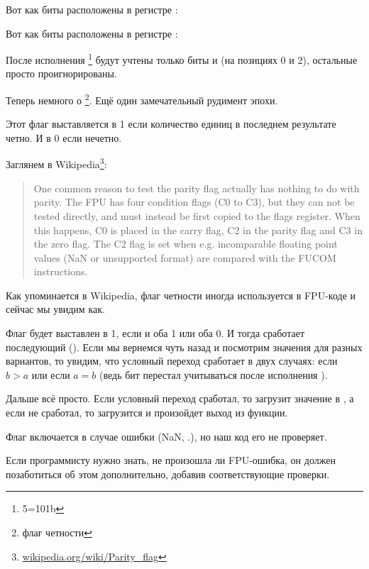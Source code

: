 Вот как биты \CThreeBits расположены в регистре \AX:



Вот как биты \CThreeBits расположены в регистре \AH:



После исполнения \footnote{5=101b} %
будут учтены только биты \Czero и \Ctwo (на позициях 0 и 2), остальные просто проигнорированы.

\label{parity_flag}
Теперь немного о \footnote{флаг четности}. 
Ещё один замечательный рудимент эпохи.

Этот флаг выставляется в 1 если количество единиц в последнем результате четно. 
И в 0 если нечетно.

Заглянем в Wikipedia\footnote{\href{http://go.yurichev.com/17131}{wikipedia.org/wiki/Parity\_flag}}:

\begin{framed}
\begin{quotation}
One common reason to test the parity flag actually has nothing to do with parity. The FPU has four condition flags 
(C0 to C3), but they can not be tested directly, and must instead be first copied to the flags register. 
When this happens, C0 is placed in the carry flag, C2 in the parity flag and C3 in the zero flag. 
The C2 flag is set when e.g. incomparable floating point values (NaN or unsupported format) are compared 
with the FUCOM instructions.
\end{quotation}
\end{framed}

Как упоминается в Wikipedia, флаг четности иногда используется в FPU-коде и сейчас мы увидим как.

Флаг \PF будет выставлен в 1, если \Czero и \Ctwo оба 1 или оба 0. 
И тогда сработает последующий \JP (). 
Если мы вернемся чуть назад и посмотрим значения \CThreeBits 
для разных вариантов, то увидим, что условный переход \JP сработает в двух случаях: если $b>a$ или если $a=b$ 
(ведь бит \Cthree перестал учитываться после исполнения ).

Дальше всё просто. Если условный переход сработал, то \FLD загрузит значение  в , 
а если не сработал, то загрузится  и произойдет выход из функции.


Флаг \Ctwo включается в случае ошибки (\gls{NaN}, \etc{}.), но наш код его не проверяет.

Если программисту нужно знать, не произошла ли FPU-ошибка, он должен позаботиться об этом
дополнительно, добавив соответствующие проверки.

\ifdefined\IncludeOlly

\fi
